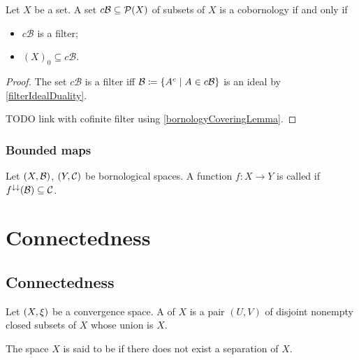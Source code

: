 \begin{lemma}
Let $X$ be a set. A set $c\mathcal{B}\subseteq \operatorname{\mathcal{P}}(X)$ of subsets of $X$ is a cobornology \textup{if and only if}
\begin{itemize}
\item $c\mathcal{B}$ is a filter;
\item $(X)_0 \subseteq c\mathcal{B}$.
\end{itemize}
\end{lemma}
\begin{proof}
The set $c\mathcal{B}$ is a filter iff $\mathcal{B}\defeq \setbuilder{A^c}{A\in c\mathcal{B}}$ is an ideal by \ref{filterIdealDuality}.

TODO link with cofinite filter using \ref{bornologyCoveringLemma}.
\end{proof}


\subsection{Bounded maps}
\begin{definition}
Let $\sSet{X, \mathcal{B}}$, $\sSet{Y,\mathcal{C}}$ be bornological spaces. A function $f: X\to Y$ is called  if $f^{\downarrow\downarrow}(\mathcal{B}) \subseteq \mathcal{C}$.
\end{definition}









\chapter{Connectedness}
\section{Connectedness}
\begin{definition}
Let $\sSet{X, \xi}$ be a convergence space. A  of $X$ is a pair $(U,V)$ of disjoint nonempty closed subsets of $X$ whose union is $X$.

The space $X$ is said to be  if there does not exist a separation of $X$.
\end{definition}

